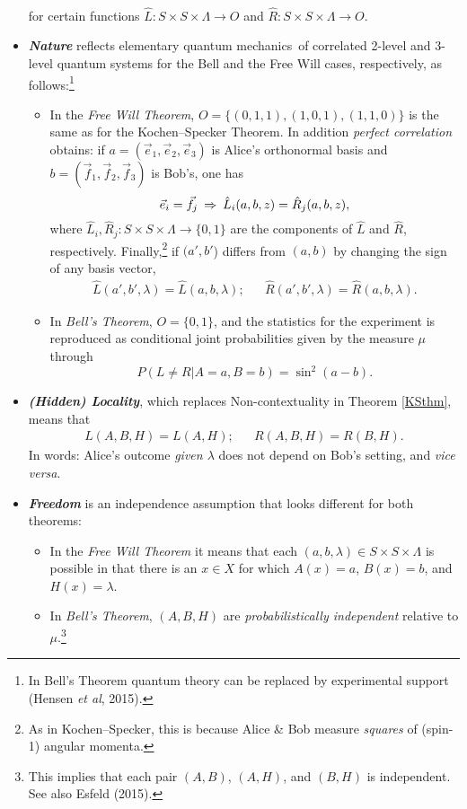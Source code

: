 \documentclass[11pt,a4paper]{article}
\numberwithin{equation}{section}
\newcommand{\hi}[1]{\emph{\textbf{#1}}}
\newcommand{\qm}{quantum mechanics}
\newcommand{\raw}{\rightarrow}
\newcommand{\x}{\times}
\newcommand{\lm}{\lambda} \newcommand{\Lm}{\Lambda}
\begin{document}
\begin{itemize}
\begin{align}
\end{align}
  for certain functions
  $\hat{L}:S \x S\x \Lm\raw O$ and  $\hat{R}:S \x S\x \Lm\raw O$. 
  \item \hi{Nature}  reflects elementary \qm\ of correlated 2-level and 3-level quantum systems for the Bell and the Free Will cases, respectively, as follows:\footnote{In Bell's Theorem quantum theory can be replaced by experimental support (Hensen  \emph{et al}, 2015). }
   \begin{itemize}
\item  In the \emph{Free Will Theorem},  $O=\{(0,1,1), (1,0,1), (1,1,0)\}$ is the same as for the Kochen--Specker Theorem. In addition  \emph{perfect correlation} obtains: if $a=(\vec{e}_1,\vec{e}_2,\vec{e}_3)$ is Alice's orthonormal basis
and  $b=(\vec{f}_1,\vec{f}_2,\vec{f}_3)$ is Bob's, one has
 \begin{equation}
\vec{e}_i=\vec{f}_j\: \Rightarrow\: \hat{L}_i(a,b,z)=\hat{R}_j(a,b,z), \label{ienj}
\end{equation}
where $\hat{L}_i, \hat{R}_j: S \x S\x \Lm\raw \{0,1\}$ are the components of $\hat{L}$ and $\hat{R}$, respectively.  Finally,\footnote{As in Kochen--Specker, this is because Alice \& Bob measure \emph{squares} of (spin-1) angular momenta.} if $(a',b'$) differs from $(a,b)$ by changing the sign of any  basis vector,
 \begin{align}
\hat{L}(a',b',\lm)=\hat{L}(a,b,\lm); && 
\hat{R}(a',b',\lm)=\hat{R}(a,b,\lm).
\end{align}
\item In \emph{Bell's Theorem}, $O=\{0,1\}$, and the statistics for the experiment is reproduced as conditional joint probabilities given by the measure $\mu$ through
\begin{equation}
P(L\neq R|A=a,B=b)=\sin^2(a-b).\label{uitkomstAspect2} 
\end{equation}
\end{itemize}
\item \hi{(Hidden)  Locality}, which replaces Non-contextuality in Theorem \ref{KSthm}, means that 
\begin{align}
L(A,B,H)=L(A,H); && R(A,B,H)=R(B,H).
\end{align} In words: Alice's outcome \emph{given $\lm$} does not depend on Bob's setting, and \emph{vice versa}. 
\item  \hi{Freedom} is an independence assumption that looks different for both theorems:
\begin{itemize}
\item In the \emph{Free Will Theorem} it means  that  each $(a,b,\lm)\in S\x S\x \Lm$ is possible in that there is an $x\in X$  for which $A(x)=a$, $B(x)=b$, and $H(x)=\lm$.
\item In  \emph{Bell's Theorem},  $(A,B,H)$ are \emph{probabilistically independent} relative to $\mu$.\footnote{This implies  that each pair $(A,B)$, $(A,H)$, and $(B,H)$ is independent. See also Esfeld (2015).}
\end{itemize}
  \end{itemize}
\end{document}
